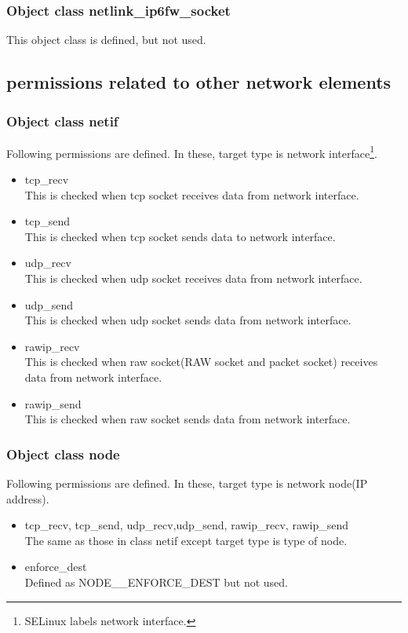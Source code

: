 \documentclass{article}
\begin{document}
\subsubsection {Object class netlink\_ip6fw\_socket}
This object class is defined, but not used.

           
\subsection{permissions related to other network elements}
\subsubsection{Object class netif}
Following permissions are defined. In these, target type is network
interface\footnote{SELinux labels network interface.}.
\begin{itemize}
 \item  tcp\_recv\\
	This is checked when tcp socket receives data from network
	interface.\\   
 \item   tcp\_send\\
	This is checked when tcp socket sends data to network
	interface.\\   
 \item udp\_recv\\
	This is checked when udp socket receives data from network
	interface.\\  
 \item udp\_send\\
	This is checked when udp socket sends data from network
	interface.\\  
 \item rawip\_recv\\
	This is checked when raw socket(RAW socket and packet socket) receives data from network
	interface.\\  
 \item rawip\_send\\
	This is checked when raw socket sends data from network
	interface.\\  
\end{itemize}


\subsubsection{Object class node}
Following permissions are defined. In these, target type is network
node(IP address).
\begin{itemize}
 \item     tcp\_recv,        tcp\_send, udp\_recv,udp\_send,
	   rawip\_recv,        rawip\_send\\
	   The same as those in class netif except target type is type
	   of node.
 \item enforce\_dest\\
	   Defined as NODE\_\_ENFORCE\_DEST but not used.
\end{itemize}
   
\end{document}
